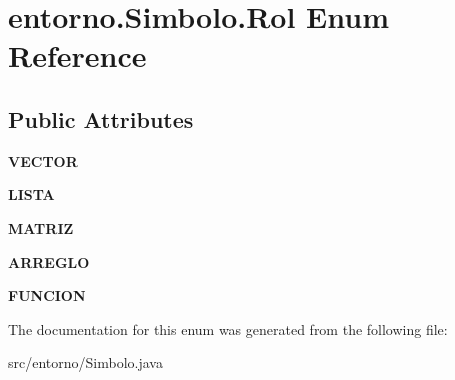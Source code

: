 \hypertarget{enumentorno_1_1_simbolo_1_1_rol}{}\section{entorno.\+Simbolo.\+Rol Enum Reference}
\label{enumentorno_1_1_simbolo_1_1_rol}
\subsection*{Public Attributes}
\begin{DoxyCompactItemize}
\item 
\mbox{\label{enumentorno_1_1_simbolo_1_1_rol_af428d7bec6529ef5a3b296225451c26d}} 
{\bfseries V\+E\+C\+T\+OR}
\item 
\mbox{\label{enumentorno_1_1_simbolo_1_1_rol_ace161dc961bb736c942e56a47b601a79}} 
{\bfseries L\+I\+S\+TA}
\item 
\mbox{\label{enumentorno_1_1_simbolo_1_1_rol_a21b1b81d4f8b607bcd7d3ba86b4dbc82}} 
{\bfseries M\+A\+T\+R\+IZ}
\item 
\mbox{\label{enumentorno_1_1_simbolo_1_1_rol_a54c9d8bb3fbc8cf54de4f2aa70f70007}} 
{\bfseries A\+R\+R\+E\+G\+LO}
\item 
\mbox{\label{enumentorno_1_1_simbolo_1_1_rol_ade66cf36298c14a69dd9f9d9c619fb93}} 
{\bfseries F\+U\+N\+C\+I\+ON}
\end{DoxyCompactItemize}


The documentation for this enum was generated from the following file\+:\begin{DoxyCompactItemize}
\item 
src/entorno/Simbolo.\+java\end{DoxyCompactItemize}
